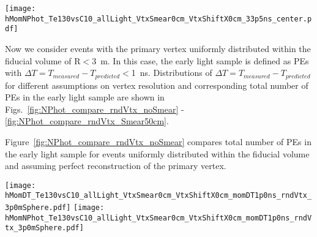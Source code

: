 \begin{figure*}[ht]
  \centering
  \texttt{[image: hMomNPhot\_Te130vsC10\_allLight\_VtxSmear0cm\_VtxShiftX0cm\_33p5ns\_center.pdf]}
  \caption{Total number of PEs in the early light sample. Comparison between $^{130}$Te 0{\nbb} decay 
    (solid red line) and $^{10}$C events (dashed green line). Events are simulated at the center of the 
    detector. Perfect vertex reconstruction - true vertex position is used. Time cut of 
    33.5~ns on the photon arrival time is applied. Histograms are normalized to 1000 events.}
\label{fig:NPhot_compare_central}
\end{figure*}

Now we consider events with the primary vertex uniformly distributed within the fiducial volume of
R$<$3~m. In this case, the early light sample is defined as PEs with $\Delta T=T_{measured} -
T_{predicted}<$1~ns. Distributions of $\Delta T=T_{measured} - T_{predicted}$ for 
different assumptions on vertex resolution and corresponding total number of PEs in the early light
sample are shown in Figs.~\ref{fig:NPhot_compare_rndVtx_noSmear} - \ref{fig:NPhot_compare_rndVtx_Smear50cm}.

Figure~\ref{fig:NPhot_compare_rndVtx_noSmear} compares total number of PEs in the early light sample for 
events uniformly distributed within the fiducial volume and assuming perfect reconstruction of the primary 
vertex.

\begin{figure*}[ht]
  \centering
  \texttt{[image: hMomDT\_Te130vsC10\_allLight\_VtxSmear0cm\_VtxShiftX0cm\_momDT1p0ns\_rndVtx\_3p0mSphere.pdf]}
  \texttt{[image: hMomNPhot\_Te130vsC10\_allLight\_VtxSmear0cm\_VtxShiftX0cm\_momDT1p0ns\_rndVtx\_3p0mSphere.pdf]}
  \caption{(Left) Difference between measured PE arrival time and arrival time prediction based on 
	vertex location (T$^{predicted} = |r_{hit} - r_{vtx}|/v_{phot}$, where $v_phot = c/1.53$).
        $\vbb$-decay (black solid line) and $\Cten$ events (magenta dashed line) are compared. 
	Vertical line at 1~ns indicates cut for early light selection. 
        (Right) Total number of PEs in the early light sample. 
        $^{10}$C events with energy deposition in the $\pm$10\% energy range around Q-value are
	selected. Verticies are uniformly distributed within the fiducial volume, $R<3$~m.
        {\bf Perfect vertex reconstruction - true vertex position is used.}}
\label{fig:NPhot_compare_rndVtx_noSmear}
\end{figure*}


